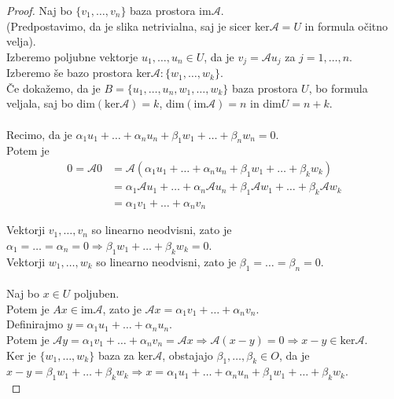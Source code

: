 \documentclass[a4paper,12pt]{article}
\newcommand{\A}{\mathcal{A}}
\begin{document}
\begin{proof}
Naj bo $\{v_1,\ldots,v_n\}$ baza prostora im$\A$.\\

(Predpostavimo, da je slika netrivialna, saj je sicer ker$\A=U$ in formula očitno velja).\\

Izberemo poljubne vektorje $u_1,\ldots,u_n\in U$, da je $v_j=\A u_j$ za $j=1,\ldots,n$.\\

Izberemo še bazo prostora ker$\A :\{w_1,\ldots,w_k\}$.\\

Če dokažemo, da je $B=\{u_1,\ldots,u_n,w_1,\ldots,w_k\}$ baza prostora $U$, bo formula veljala, saj bo dim$(\text{ker}\A)=k$, dim$(\text{im}\A)=n$ in dim$U=n+k$.\\

 \\

Recimo, da je $\alpha_1u_1+\ldots+\alpha_nu_n+\beta_1w_1+\ldots+\beta_nw_n=0$.\\

Potem je 
\begin{align*}
0=\A 0 & =\A (\alpha_1u_1+\ldots+\alpha_nu_n+\beta_1w_1+\ldots+\beta_kw_k) \\
& = \alpha_1 \A u_1+\ldots+\alpha_n \A u_n+\beta_1 \A w_1+\ldots+\beta_k \A w_k \\
& = \alpha_1v_1+\ldots+\alpha_nv_n
\end{align*}

Vektorji $v_1,\ldots,v_n$ so linearno neodvisni, zato je $\alpha_1=\ldots=\alpha_n=0 \Rightarrow \beta_1w_1+\ldots+\beta_kw_k=0$. \\

Vektorji $w_1,\ldots,w_k$ so linearno neodvisni, zato je $\beta_1=\ldots=\beta_n=0$.\\

 \\

Naj bo $x\in U$ poljuben.\\

Potem je $A x\in \text{im}\A$, zato je $\A x=\alpha_1v_1+\ldots+\alpha_nv_n$. \\

Definirajmo $y=\alpha_1u_1+\ldots+\alpha_nu_n$.\\

Potem je $\A y=\alpha_1v_1+\ldots+\alpha_nv_n=\A x\Rightarrow \A (x-y)=0 \Rightarrow x-y\in \text{ker}\A$.\\

Ker je $\{w_1,\ldots,w_k\}$ baza za ker$\A$, obstajajo $\beta_1,\ldots,\beta_k\in O$, da je $x-y=\beta_1w_1+\ldots+\beta_kw_k\Rightarrow x=\alpha_1u_1+\ldots+\alpha_nu_n+\beta_1w_1+\ldots+\beta_kw_k$.\\
\end{proof}
\end{document}
